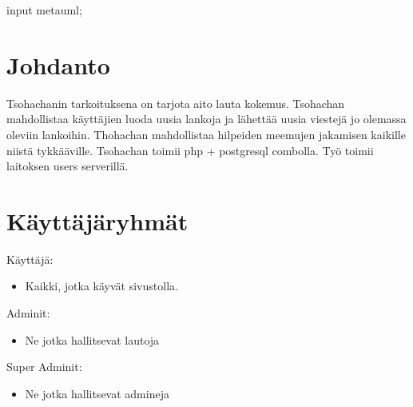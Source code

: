 \documentclass[10pt,a4paper]{article}
\begin{document}
\begin{empfile}
\begin{empcmds}
input metauml;
\end{empcmds}
\section{Johdanto}
Tsohachanin tarkoituksena on tarjota aito lauta kokemus. Tsohachan mahdollistaa käyttäjien luoda uusia lankoja ja lähettää uusia viestejä jo olemassa oleviin lankoihin. Thohachan mahdollistaa hilpeiden meemujen jakamisen kaikille niistä tykkääville. Tsohachan toimii php + postgresql combolla. Työ toimii laitoksen users serverillä. 
\section{Käyttäjäryhmät}
Käyttäjä:
\begin{itemize}
\item Kaikki, jotka käyvät sivustolla.
\end{itemize}
Adminit:
\begin{itemize}
\item Ne jotka hallitsevat lautoja
\end{itemize}
Super Adminit:
\begin{itemize}
\item Ne jotka hallitsevat admineja
\end{itemize}

\end{empfile}
\end{document}
